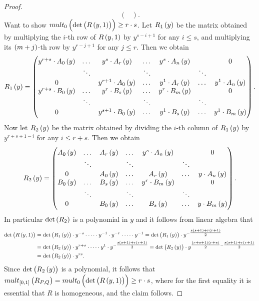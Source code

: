 \begin{proof}
$$\begin{pmatrix}
\end{pmatrix}.
$$
Want to show $ mult_0\br{\det\br{R\br{y, 1}}} \ge r \cdot s $. Let $ R_1\br{y} $ be the matrix obtained by multiplying the $ i $-th row of $ R\br{y, 1} $ by $ y^{s - i + 1} $ for any $ i \le s $, and multiplying its $ \br{m + j} $-th row by $ y^{r - j + 1} $ for any $ j \le r $. Then we obtain
$$ R_1\br{y} =
\begin{pmatrix}
y^{r + s} \cdot A_0\br{y} & \dots & y^s \cdot A_r\br{y} & \dots & y^s \cdot A_n\br{y} & & 0 \\
& \ddots & & \ddots & & \ddots & \\
0 & & y^{r + 1} \cdot A_0\br{y} & \dots & y^1 \cdot A_r\br{y} & \dots & y^1 \cdot A_n\br{y} \\
y^{r + s} \cdot B_0\br{y} & \dots & y^r \cdot B_s\br{y} & \dots & y^r \cdot B_m\br{y} & & 0 \\
& \ddots & & \ddots & & \ddots & \\
0 & & y^{s + 1} \cdot B_0\br{y} & \dots & y^1 \cdot B_s\br{y} & \dots & y^1 \cdot B_m\br{y}
\end{pmatrix}.
$$
Now let $ R_2\br{y} $ be the matrix obtained by dividing the $ i $-th column of $ R_1\br{y} $ by $ y^{r + s + 1 - i} $ for any $ i \le r + s $. Then we obtain
$$ R_2\br{y} =
\begin{pmatrix}
A_0\br{y} & \dots & A_r\br{y} & \dots & y^s \cdot A_n\br{y} & & 0 \\
& \ddots & & \ddots & & \ddots & \\
0 & & A_0\br{y} & \dots & A_r\br{y} & \dots & y \cdot A_n\br{y} \\
B_0\br{y} & \dots & B_s\br{y} & \dots & y^r \cdot B_m\br{y} & & 0 \\
& \ddots & & \ddots & & \ddots & \\
0 & & B_0\br{y} & \dots & B_s\br{y} & \dots & y \cdot B_m\br{y}
\end{pmatrix}.
$$
In particular $ \det\br{R_2} $ is a polynomial in $ y $ and it follows from linear algebra that
\begin{align*}
\det\br{R\br{y, 1}}
& = \det\br{R_1\br{y}} \cdot y^{-s} \cdot \dots \cdot y^{-1} \cdot y^{-r} \cdot \dots \cdot y^{-1}
= \det\br{R_1\br{y}} \cdot y^{-\tfrac{s\br{s + 1}+r\br{r + 1}}{2}} \\
& = \det\br{R_2\br{y}} \cdot y^{r + s} \cdot \dots \cdot y^1 \cdot y^{-\tfrac{s\br{s + 1} + r\br{r + 1}}{2}}
= \det\br{R_2\br{y}} \cdot y^{\tfrac{\br{r + s + 1}\br{r + s}}{2} - \tfrac{s\br{s + 1}+r\br{r + 1}}{2}} \\
& = \det\br{R_2\br{y}} \cdot y^{rs}.
\end{align*}
Since $ \det\br{R_2\br{y}} $ is a polynomial, it follows that $ mult_{\sbr{0, 1}}\br{R_{P, Q}} = mult_0\br{\det\br{R\br{y, 1}}} \ge r \cdot s $, where for the first equality it is essential that $ R $ is homogeneous, and the claim follows.
\end{proof}

